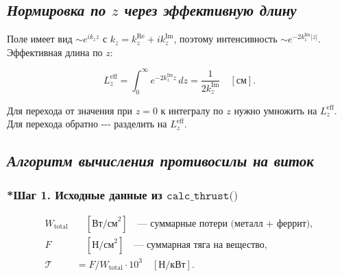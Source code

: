 \documentclass[11pt]{article}
\begin{document}
    \subsection{\texorpdfstring{\emph{Нормировка по \(z\) через эффективную
длину}}{Нормировка по z через эффективную длину}}\label{ux43dux43eux440ux43cux438ux440ux43eux432ux43aux430-ux43fux43e-z-ux447ux435ux440ux435ux437-ux44dux444ux444ux435ux43aux442ux438ux432ux43dux443ux44e-ux434ux43bux438ux43dux443}

Поле имеет вид \(\sim e^{ik_z z}\) с
\(k_z = k_z^{\text{Re}} + ik_z^{\text{Im}}\), поэтому интенсивность
\(\sim e^{-2k_z^{\text{Im}}|z|}\). Эффективная длина по \(z\):

\begin{equation*}
    L_z^{\text{eff}} = \int_0^{\infty} e^{-2k_z^{\text{Im}} z}\,dz
    = \frac{1}{2k_z^{\text{Im}}}
    \quad [\text{см}].
\end{equation*}

Для перехода от значения при \(z = 0\) к интегралу по \(z\) нужно
умножить на \(L_z^{\text{eff}}\). Для перехода обратно -\/-\/- разделить
на \(L_z^{\text{eff}}\).

    \subsection{\texorpdfstring{\emph{Алгоритм вычисления противосилы на
виток}}{Алгоритм вычисления противосилы на виток}}\label{ux430ux43bux433ux43eux440ux438ux442ux43c-ux432ux44bux447ux438ux441ux43bux435ux43dux438ux44f-ux43fux440ux43eux442ux438ux432ux43eux441ux438ux43bux44b-ux43dux430-ux432ux438ux442ux43eux43a}

\subsubsection{\texorpdfstring{*Шаг 1. Исходные данные из
\(\texttt{calc\_thrust()}\)}{*Шаг 1. Исходные данные из \textbackslash{}texttt\{calc\textbackslash{}\_thrust()\}}}\label{ux448ux430ux433-1.-ux438ux441ux445ux43eux434ux43dux44bux435-ux434ux430ux43dux43dux44bux435-ux438ux437-textttcalc_thrust}

\begin{align*}
    W_{\text{total}} &\quad [\text{Вт/см}^2]
        \quad\text{--- суммарные потери (металл + феррит)}, \\
    F &\quad [\text{Н/см}^2]
        \quad\text{--- суммарная тяга на вещество}, \\
    \mathcal{T} &= F / W_{\text{total}} \cdot 10^3
        \quad [\text{Н/кВт}].
\end{align*}
\end{document}
